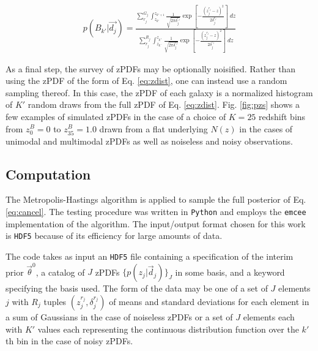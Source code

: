 \documentclass[preprint]{aastex}
\begin{document}
\begin{eqnarray}
\label{eq:zdist}
p(B_{k'}|\vec{d_{j}}) = \frac{\sum_{r_{j}}^{G_{j}}\int_{z_{k'}}^{z_{k'+1}} \frac{1}{\sqrt{2\pi\delta^{r_{j}}_{j}}}\exp\left[-\frac{(z^{r_{j}}_{j}-z)^{2}}{2\delta^{r_{j}}_{j}}\right]\ dz}{\sum_{r_{j}}^{R_{j}}\int_{z_{k^{-}}}^{z_{k^{+}}} \frac{1}{\sqrt{2\pi\delta^{r_{j}}_{j}}}\exp\left[-\frac{(z^{r_{j}}_{j}-z)^{2}}{2\delta^{r_{j}}_{j}}\right]\ dz}
\end{eqnarray}

As a final step, the survey of zPDFs may be optionally noisified.  Rather than using the zPDF of the form of Eq. \ref{eq:zdist}, one can instead use a random sampling thereof.  In this case, the zPDF of each galaxy is a normalized histogram of $K'$ random draws from the full zPDF of Eq. \ref{eq:zdist}.  Fig. \ref{fig:pzs} shows a few examples of simulated zPDFs in the case of a choice of $K=25$ redshift bins from $z^{B}_{0}=0$ to $z^{B}_{35}=1.0$ drawn from a flat underlying $N(z)$ in the cases of unimodal and multimodal zPDFs as well as noiseless and noisy observations.


\subsection{Computation}
\label{sec:mcmc}

The Metropolis-Hastings algorithm is applied to sample the full posterior of Eq. \ref{eq:cancel}.  The testing procedure was written in \texttt{Python} and employs the \texttt{emcee} implementation of the algorithm.  \citep{for12}  The input/output format chosen for this work is \texttt{HDF5} because of its efficiency for large amounts of data.

The code takes as input an \texttt{HDF5} file containing a specification of the interim prior $\vec{\theta}^{0}$, a catalog of $J$ zPDFs $\{p(z_{j}|\vec{d}_{j})\}_{J}$ in some basis, and a keyword specifying the basis used.  The form of the data may be one of a set of $J$ elements $j$ with $R_{j}$ tuples $(z_{j}^{r_{j}},\delta_{j}^{r_{j}})$ of means and standard deviations for each element in a sum of Gaussians in the case of noiseless zPDFs or a set of $J$ elements each with $K'$ values each representing the continuous distribution function over the $k'$th bin in the case of noisy zPDFs.
\end{document}
